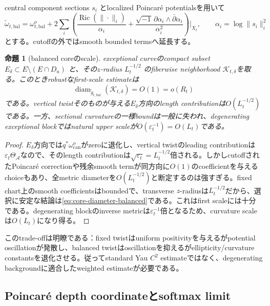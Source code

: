 \documentclass[11pt,a4paper]{ltjsarticle}
\newtheorem{proposition}[theorem]{命題}
\theoremstyle{definition}
\theoremstyle{remark}
\newcommand{\diam}{\operatorname{diam}}
\newcommand{\Ric}{\operatorname{Ric}}
\newcommand{\eps}{\varepsilon}
\begin{document}
central component sections $s_i$ とlocalized Poincaré potentialsを用いて
\begin{equation}\label{eq:balanced-poincare}
 \widetilde\omega_{t,\mathrm{bal}}
 =\omega_{t,\mathrm{bal}}^o
 +2\sum_i\left(
  \frac{\Ric(\|\cdot\|_i)}{\alpha_i}
  +\frac{\sqrt{-1}\,\partial\alpha_i\wedge\bar\partial\alpha_i}{\alpha_i^2}
 \right)\Big|_{X_t},
 \qquad \alpha_i=\log\|s_i\|_i^2
\end{equation}
とする。cutoffの外ではsmooth bounded termsへ延長する。

\begin{proposition}[balanced coreのscale]\label{prop:balanced-core-scale}
exceptional curveのcompact subset $E_\delta\subset E\setminus(E\cap D_u)$ と、その$z$-radius $L_t^{-1/2}$ のfiberwise neighborhood $\mathcal K_{t,\delta}$を取る。このときrobustなfirst-scale estimateは
\begin{equation}\label{eq:core-diameter-balanced}
 \diam_{\widetilde g_{t,\mathrm{bal}}}(\mathcal K_{t,\delta})
 =O(1)=o(R_t)
\end{equation}
である。vertical twistそのものが与える$E_\delta$方向のlength contributionは$O(L_t^{-1/2})$である。一方、sectional curvatureの一様boundは一般に失われ、degenerating exceptional blockではnatural upper scaleが$O(\eps_t^{-1})=O(L_t)$である。
\end{proposition}

\begin{proof}
$E_\delta$方向では$q^*\omega_{\mathrm{can}}^o$がzeroに退化し、vertical twistのleading contributionは$\eps_t\Theta_{\mathcal A}$なので、そのlength contributionは$\sqrt{\eps_t}=L_t^{-1/2}$倍される。しかしcutoffされたPoincaré correctionや残余smooth termが同方向に$O(1)$のcoefficientを与えるchoiceもあり、全metric diameterを$O(L_t^{-1/2})$と断定するのは強すぎる。fixed chart上のsmooth coefficientsはboundedで、transverse $z$-radiusは$L_t^{-1/2}$だから、選択に安定な結論は\eqref{eq:core-diameter-balanced}である。これはfirst scaleには十分である。degenerating blockのinverse metricは$\eps_t^{-1}$倍となるため、curvature scaleは$O(L_t)$になり得る。
\end{proof}

このtrade-offは明瞭である：fixed twistはuniform positivityを与えるがpotential oscillationが発散し、balanced twistはoscillationを抑えるがellipticity/curvature constantsを退化させる。従ってstandard Yau $C^2$ estimateではなく、degenerating backgroundに適合したweighted estimateが必要である。

\subsection{Poincaré depth coordinateとsoftmax limit}
\end{document}
